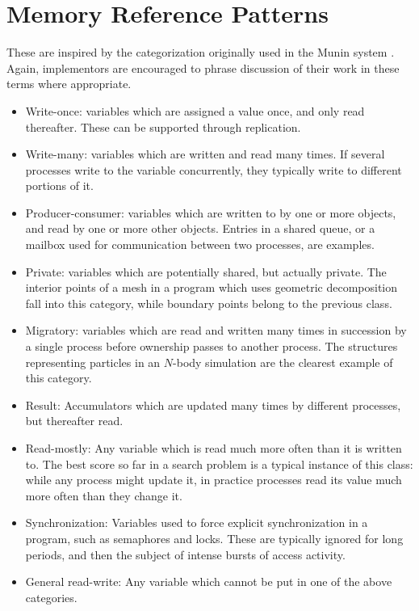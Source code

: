 \section{Memory Reference Patterns\label{s:memory}}

These are inspired by the categorization originally used in the Munin system \cite{b:munin-overview}.
Again, implementors are encouraged to phrase discussion of their work in these terms where appropriate.

\begin{itemize}
\item	Write-once:
	variables which are assigned a value once, and only read thereafter.
	These can be supported through replication.
\item	Write-many:
	variables which are written and read many times.
	If several processes write to the variable concurrently, they typically write to different portions of it.
\item	Producer-consumer:
	variables which are written to by one or more objects, and read by one or more other objects.
	Entries in a shared queue, or a mailbox used for communication between two processes, are examples.
\item	Private:
	variables which are potentially shared, but actually private.
	The interior points of a mesh in a program which uses geometric decomposition fall into this category,
	while boundary points belong to the previous class.
\item	Migratory:
	variables which are read and written many times in succession by a single process before ownership passes to another process.
	The structures representing particles in an $N$-body simulation are the clearest example of this category.
\item	Result:
	Accumulators which are updated many times by different processes, but thereafter read.
\item	Read-mostly:
	Any variable which is read much more often than it is written to.
	The best score so far in a search problem is a typical instance of this class:
	while any process might update it, in practice processes read its value much more often than they change it.
\item	Synchronization:
	Variables used to force explicit synchronization in a program, such as semaphores and locks.
	These are typically ignored for long periods, and then the subject of intense bursts of access activity.
\item	General read-write:
	Any variable which cannot be put in one of the above categories.
\end{itemize}
